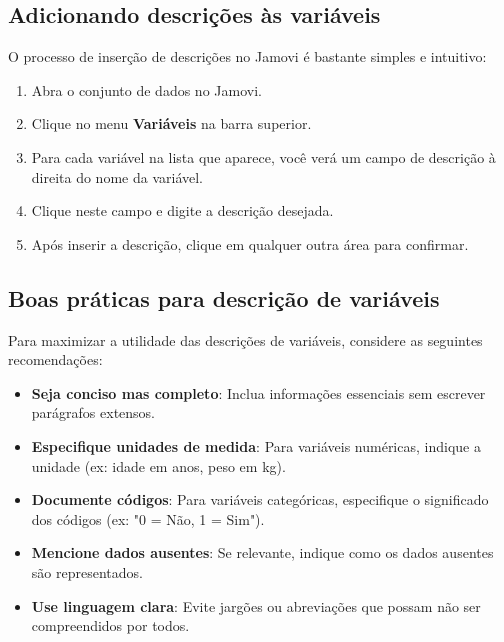 \subsection{Adicionando descrições às variáveis}

O processo de inserção de descrições no Jamovi é bastante simples e intuitivo:

\begin{enumerate}
    \item Abra o conjunto de dados no Jamovi.
    \item Clique no menu \textbf{Variáveis} na barra superior.
    \item Para cada variável na lista que aparece, você verá um campo de descrição à direita do nome da variável.
    \item Clique neste campo e digite a descrição desejada.
    \item Após inserir a descrição, clique em qualquer outra área para confirmar.
\end{enumerate}


\subsection{Boas práticas para descrição de variáveis}

Para maximizar a utilidade das descrições de variáveis, considere as seguintes recomendações:

\begin{itemize}
    \item \textbf{Seja conciso mas completo}: Inclua informações essenciais sem escrever parágrafos extensos.
    \item \textbf{Especifique unidades de medida}: Para variáveis numéricas, indique a unidade (ex: idade em anos, peso em kg).
    \item \textbf{Documente códigos}: Para variáveis categóricas, especifique o significado dos códigos (ex: "0 = Não, 1 = Sim").
    \item \textbf{Mencione dados ausentes}: Se relevante, indique como os dados ausentes são representados.
    \item \textbf{Use linguagem clara}: Evite jargões ou abreviações que possam não ser compreendidos por todos.
\end{itemize}

